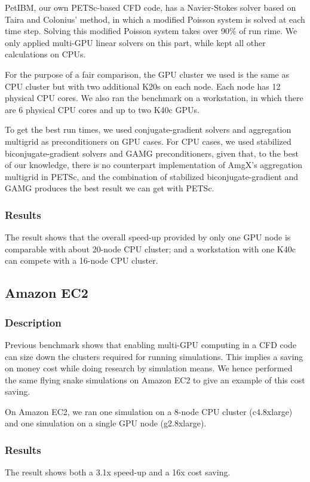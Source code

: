     PetIBM, our own PETSc-based CFD code, has a Navier-Stokes solver based on Taira and Colonius' method\cite{Taira-2007-ID69}, in which a modified Poisson system is solved at each time step.
    Solving this modified Poisson system takes over 90\% of run rime.
    We only applied multi-GPU linear solvers on this part, while kept all other calculations on CPUs.

    For the purpose of a fair comparison,
    the GPU cluster we used is the same as CPU cluster but with two additional K20s on each node.
    Each node has 12 physical CPU cores.
    We also ran the benchmark on a workstation, 
    in which there are 6 physical CPU cores and up to two K40c GPUs.

    To get the best run times, 
    we used conjugate-gradient solvers and aggregation multigrid as preconditioners on GPU cases.
    For CPU cases,
    we used stabilized biconjugate-gradient solvers and GAMG preconditioners,
    given that, to the best of our knowledge, 
    there is no counterpart implementation of AmgX's aggregation multigrid in PETSc,
    and the combination of stabilized biconjugate-gradient
    and GAMG produces the best result we can get with PETSc.

    \subsubsection{Results}
    The result shows that the overall speed-up provided by only one GPU node is comparable with about 20-node CPU cluster; 
    and a workstation with one K40c can compete with a 16-node CPU cluster.

\subsection{Amazon EC2}

    \subsubsection{Description}
    Previous benchmark shows that enabling multi-GPU computing in a CFD code can size down the clusters required for running simulations.
    This implies a saving on money cost while doing research by simulation means.
    We hence performed the same flying snake simulations on Amazon EC2 to give an example of this cost saving.

    On Amazon EC2, we ran one simulation on a 8-node CPU cluster (c4.8xlarge)
    and one simulation on a single GPU node (g2.8xlarge). 

    \subsubsection{Results}
    The result shows both a 3.1x speed-up and a 16x cost saving.


